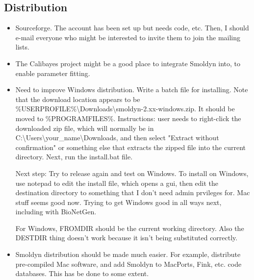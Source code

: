 \documentclass {scrbook}
\begin{document}
\subsection{Distribution}
\begin{itemize}
\item Sourceforge. The account has been set up but needs code, etc. Then, I should e-mail everyone who might be interested to invite them to join the mailing lists.
\item The Calibayes project might be a good place to integrate Smoldyn into, to enable parameter fitting.
\item Need to improve Windows distribution. Write a batch file for installing. Note that the download location appears to be \%USERPROFILE\%\textbackslash Downloads\textbackslash smoldyn-2.xx-windows.zip. It should be moved to \%PROGRAMFILES\%. Instructions: user needs to right-click the downloaded zip file, which will normally be in C:\textbackslash Users\textbackslash your\_name\textbackslash Downloads, and then select "Extract without confirmation" or something else that extracts the zipped file into the current directory. Next, run the install.bat file.

Next step: Try to release again and test on Windows. To install on Windows, use notepad to edit the install file, which opens a gui, then edit the destination directory to something that I don't need admin prvileges for. Mac stuff seems good now. Trying to get Windows good in all ways next, including with BioNetGen.

For Windows, FROMDIR should be the current working directory. Also the DESTDIR thing doesn't work because it isn't being substituted correctly.

\item Smoldyn distribution should be made much easier. For example, distribute pre-compiled Mac software, and add Smoldyn to MacPorts, Fink, etc. code databases. This has be done to some extent.
\end{itemize}
\end{document}
